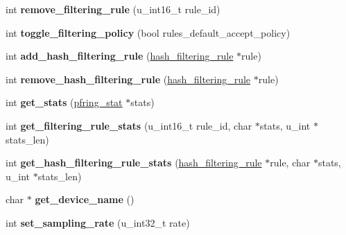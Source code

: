 \begin{DoxyCompactItemize}
\item 
\hypertarget{class_p_f_r_af1bf07cf8f08f42a65cb628004a97b07}{
int {\bfseries remove\_\-filtering\_\-rule} (u\_\-int16\_\-t rule\_\-id)}
\label{class_p_f_r_af1bf07cf8f08f42a65cb628004a97b07}

\item 
\hypertarget{class_p_f_r_ad5b678d5645262a52b4e4572a182b1fc}{
int {\bfseries toggle\_\-filtering\_\-policy} (bool rules\_\-default\_\-accept\_\-policy)}
\label{class_p_f_r_ad5b678d5645262a52b4e4572a182b1fc}

\item 
\hypertarget{class_p_f_r_ad70349b078834068d76ae8e29b9839f0}{
int {\bfseries add\_\-hash\_\-filtering\_\-rule} (\hyperlink{structhash__filtering__rule}{hash\_\-filtering\_\-rule} $\ast$rule)}
\label{class_p_f_r_ad70349b078834068d76ae8e29b9839f0}

\item 
\hypertarget{class_p_f_r_ac44735b7e4d68a57810b03943af11ccf}{
int {\bfseries remove\_\-hash\_\-filtering\_\-rule} (\hyperlink{structhash__filtering__rule}{hash\_\-filtering\_\-rule} $\ast$rule)}
\label{class_p_f_r_ac44735b7e4d68a57810b03943af11ccf}

\item 
\hypertarget{class_p_f_r_ada6e307d8383ccd3f00d687617f82412}{
int {\bfseries get\_\-stats} (\hyperlink{structpfring__stat}{pfring\_\-stat} $\ast$stats)}
\label{class_p_f_r_ada6e307d8383ccd3f00d687617f82412}

\item 
\hypertarget{class_p_f_r_a58332322ac84d75ad85000d28cbacff2}{
int {\bfseries get\_\-filtering\_\-rule\_\-stats} (u\_\-int16\_\-t rule\_\-id, char $\ast$stats, u\_\-int $\ast$stats\_\-len)}
\label{class_p_f_r_a58332322ac84d75ad85000d28cbacff2}

\item 
\hypertarget{class_p_f_r_a451f4786a25687c26ea6edf0bcee6551}{
int {\bfseries get\_\-hash\_\-filtering\_\-rule\_\-stats} (\hyperlink{structhash__filtering__rule}{hash\_\-filtering\_\-rule} $\ast$rule, char $\ast$stats, u\_\-int $\ast$stats\_\-len)}
\label{class_p_f_r_a451f4786a25687c26ea6edf0bcee6551}

\item 
\hypertarget{class_p_f_r_a8bc6f340b30cebdd18033f1bb36eedf2}{
char $\ast$ {\bfseries get\_\-device\_\-name} ()}
\label{class_p_f_r_a8bc6f340b30cebdd18033f1bb36eedf2}

\item 
\hypertarget{class_p_f_r_abde0e82a175b099949ffe922231a8982}{
int {\bfseries set\_\-sampling\_\-rate} (u\_\-int32\_\-t rate)}
\label{class_p_f_r_abde0e82a175b099949ffe922231a8982}


\end{DoxyCompactItemize}
